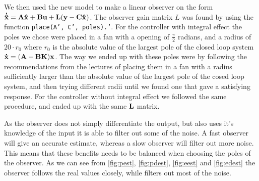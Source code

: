 We then used the new model to make a linear observer on the form $\mathbf{\dot{\hat x}} = \mathbf{A}\mathbf{\hat x} + \mathbf{B}\mathbf{u} + \mathbf{L} (\mathbf{y}-\mathbf{C}\mathbf{\hat x})$. The observer gain matrix $L$ was found by using the function \texttt{place(A', C', poles).'}. For the controller with integral effect the poles we chose were placed in a fan with a opening of $\frac{\pi}{2}$ radians, and a radius of $20 \cdot r_0$ where $r_0$ is the absolute value of the largest pole of the closed loop system $\mathbf{\dot x} = (\mathbf{A} - \mathbf{B} \mathbf{K}) \mathbf{x}$. The way we ended up with these poles were by following the recommendations from the lectures of placing them in a fan with a radius sufficiently larger than the absolute value of the largest pole of the cosed loop system, and then trying different radii until we found one that gave a satisfying response. For the controller without integral effect we followed the same procedure, and ended up with the same $\mathbf{L}$ matrix.

As the observer does not simply differentiate the output, but also uses it's knowledge of the input it is able to filter out some of the noise. A fast observer will give an accurate estimate, whereas a slow observer will filter out more noise. This means that these benefits needs to be balanced when choosing the poles of the observer. As we can see from \cref{fig:pest}, \cref{fig:pdest}, \cref{fig:eest} and \cref{fig:edest} the observer follows the real values closely, while filters out most of the noise.

